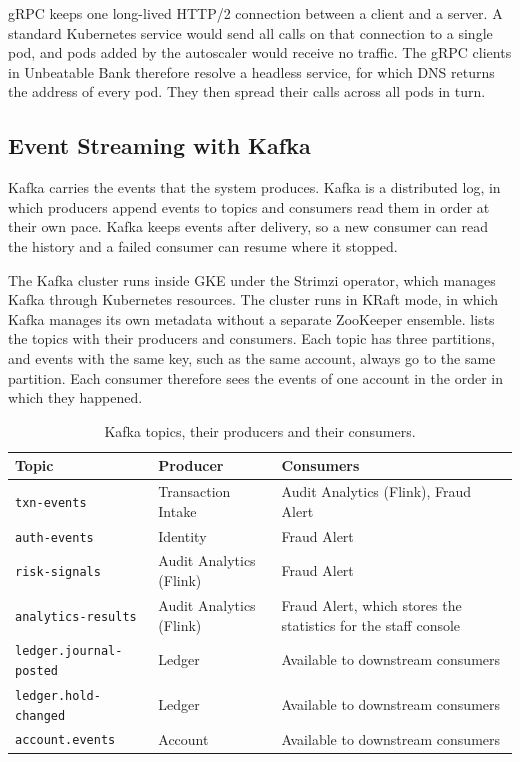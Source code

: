 \documentclass[11pt,a4paper]{article}
\newcommand{\project}{Unbeatable Bank}
\newcommand{\code}[1]{\texttt{#1}}
\begin{document}
gRPC keeps one long-lived HTTP/2 connection between a client and a server. A standard Kubernetes service would send all calls on that connection to a single pod, and pods added by the autoscaler would receive no traffic. The gRPC clients in \project{} therefore resolve a headless service, for which DNS returns the address of every pod. They then spread their calls across all pods in turn.

\subsection{Event Streaming with Kafka}
\label{sec:kafka}

Kafka carries the events that the system produces. Kafka is a distributed log, in which producers append events to topics and consumers read them in order at their own pace. Kafka keeps events after delivery, so a new consumer can read the history and a failed consumer can resume where it stopped.

The Kafka cluster runs inside GKE under the Strimzi operator, which manages Kafka through Kubernetes resources. The cluster runs in KRaft mode, in which Kafka manages its own metadata without a separate ZooKeeper ensemble.  lists the topics with their producers and consumers. Each topic has three partitions, and events with the same key, such as the same account, always go to the same partition. Each consumer therefore sees the events of one account in the order in which they happened.

\begin{table}[H]\centering\small
\caption{Kafka topics, their producers and their consumers.}\label{tab:topics}
\begin{tabularx}{\linewidth}{@{}L{3.6cm}L{3.2cm}Y@{}}
\toprule
Topic & Producer & Consumers \\
\midrule
\code{txn-events} & Transaction Intake & Audit Analytics (Flink), Fraud Alert \\
\code{auth-events} & Identity & Fraud Alert \\
\code{risk-signals} & Audit Analytics (Flink) & Fraud Alert \\
\code{analytics-results} & Audit Analytics (Flink) & Fraud Alert, which stores the statistics for the staff console \\
\code{ledger.journal-posted} & Ledger & Available to downstream consumers \\
\code{ledger.hold-changed} & Ledger & Available to downstream consumers \\
\code{account.events} & Account & Available to downstream consumers \\
\bottomrule
\end{tabularx}
\end{table}
\end{document}
